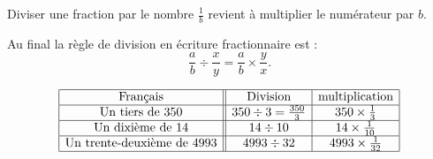 

\begin{Aretenir}
    Diviser une fraction par le nombre \( \frac{1}{ b }\) revient à multiplier le numérateur par \( b\).
\end{Aretenir}

\begin{Aretenir}
    Au final la règle de division en écriture fractionnaire est :
    \begin{equation}
        \frac{ a }{ b }\div \frac{ x }{ y }=\frac{ a }{ b }\times \frac{ y }{ x }.
    \end{equation}
\end{Aretenir}

\begin{equation*}
    \begin{array}[]{|c||c|c|}
        \hline
        \text{Français}&\text{Division}&\text{multiplication}\\
        \hline
        \text{Un tiers de \( 350\)}&350\div 3=\frac{ 350 }{ 3 }&350\times \frac{1}{ 3 }\\
        \hline
        \text{Un dixième de \( 14\)}&14\div 10&14\times \frac{1}{ 10 }\\
        \hline
        \text{Un trente-deuxième de \( 4993\)}&4993\div 32&4993\times \frac{1}{ 32 }\\
        \hline
    \end{array}
\end{equation*}

